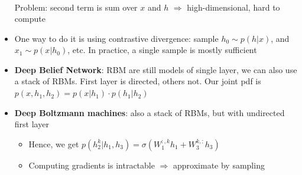 \begin{itemize}
\begin{equation*}
\begin{split}
		\end{split}
	\end{equation*}
	Problem: second term is sum over $x$ and $h$ $\Rightarrow$ high-dimensional, hard to compute
	\item One way to do it is using contrastive divergence: sample $h_0 \sim p(h|x)$, and $x_1 \sim p(x|h_0)$, etc. In practice, a single sample is mostly sufficient
	\item \textbf{Deep Belief Network}: RBM are still models of single layer, we can also use a stack of RBMs. First layer is directed, others not. Our joint pdf is $p(x, h_1, h_2) = p(x|h_1)\cdot p(h_1|h_2)$
	\item \textbf{Deep Boltzmann machines}: also a stack of RBMs, but with undirected first layer
	\begin{itemize}
		\item Hence, we get $p(h_2^{k}|h_1, h_3) = \sigma \left(W_1^{:,k}h_1 + W_3^{k,:}h_3 \right)$
		\item Computing gradients is intractable $\Rightarrow$ approximate by sampling
	\end{itemize}
\end{itemize}
